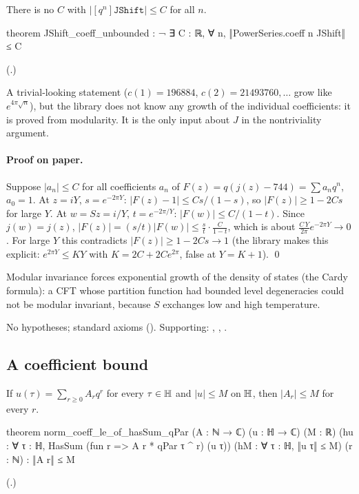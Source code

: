 \begin{theorem}\label{ch19:thm:Junbounded}
There is no $C$ with $|[q^n]\mathtt{JShift}|\le C$ for all $n$.
\end{theorem}
\begin{leancode}
theorem JShift_coeff_unbounded : ¬ ∃ C : ℝ, ∀ n, ‖PowerSeries.coeff n JShift‖ ≤ C
\end{leancode}
(.)
\begin{dictionary}
A trivial-looking statement ($c(1)=196884$, $c(2)=21493760,\dots$ grow like $e^{4\pi\sqrt n}$), but the library does not know
any growth of the individual coefficients: it is proved from modularity.  It is the only input about $J$ in the
nontriviality argument.
\end{dictionary}
\paragraph{Proof on paper.}  Suppose $|a_n|\le C$ for all coefficients $a_n$ of $F(z)=q(j(z)-744)=\sum a_nq^n$, $a_0=1$.  At $z=iY$,
$s=e^{-2\pi Y}$: $|F(z)-1|\le Cs/(1-s)$, so $|F(z)|\ge1-2Cs$ for large $Y$.  At $w=S z=i/Y$, $t=e^{-2\pi/Y}$: $|F(w)|\le C/(1-t)$.
Since $j(w)=j(z)$, $|F(z)|=(s/t)|F(w)|\le\frac{s}{t}\cdot\frac C{1-t}$, which is about $\frac{C\,Y}{2\pi}e^{-2\pi Y}\to0$.  For large $Y$
this contradicts $|F(z)|\ge1-2Cs\to1$ (the library makes this explicit: $e^{2\pi Y}\le KY$ with $K=2C+2Ce^{2\pi}$, false at
$Y=K+1$). \qed
\begin{physics}Modular invariance forces exponential growth of the density of states (the Cardy formula): a CFT whose
partition function had bounded level degeneracies could not be modular invariant, because $S$ exchanges low and high
temperature.\end{physics}
\begin{status}No hypotheses; standard axioms ().  Supporting:
, , .\end{status}

\subsection{A coefficient bound}

\begin{theorem}\label{ch19:thm:coeffbound}
If $u(\tau)=\sum_{r\ge0}A_rq^r$ for every $\tau\in\mathbb{H}$ and $|u|\le M$ on $\mathbb{H}$, then $|A_r|\le M$ for every $r$.
\end{theorem}
\begin{leancode}
theorem norm_coeff_le_of_hasSum_qPar (A : ℕ → ℂ) (u : ℍ → ℂ) (M : ℝ)
    (hu : ∀ τ : ℍ, HasSum (fun r => A r * qPar τ ^ r) (u τ)) (hM : ∀ τ : ℍ, ‖u τ‖ ≤ M)
    (r : ℕ) : ‖A r‖ ≤ M
\end{leancode}
(.)
